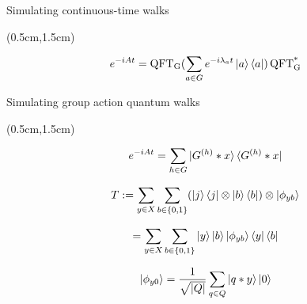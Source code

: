 \documentclass{beamer}
\theoremstyle{definition}
\begin{document}
\begin{frame}{Simulating continuous-time walks}
    
    \begin{textblock*}{12cm}(0.5cm,1.5cm)
      
       \[
       e^{-iAt} = \operatorname{QFT_G}(\sum_{a \in G}e^{-i\lambda_at}\ket{a}\bra{a})\operatorname{QFT^*_G}
       \]




    \end{textblock*}

\end{frame}








\begin{frame}{Simulating group action quantum walks}
    
    \begin{textblock*}{12cm}(0.5cm,1.5cm)

        \[
        e^{-iAt} = \sum_{h \in G}\ket{G^{(h)}*x}\bra{G^{(h)}*x}
        \]

        \[
        T := \sum_{y \in X}\sum_{b \in {\{0,1\}}}(\ket{j}\bra{j}\otimes\ket{b}\bra{b})\otimes\ket{\phi_{yb}}
        \]

        \[
        = \sum_{y \in X}\sum_{b \in {\{0,1\}}}\ket{y}\ket{b}\ket{\phi_{yb}}\bra{y}\bra{b}
        \]

        \[
            \ket{\phi_{y0}} = \frac{1}{\sqrt{|Q|}}\sum_{q \in Q}\ket{q*y}\ket{0}
        \]
        

    \end{textblock*}

\end{frame}
\end{document}
